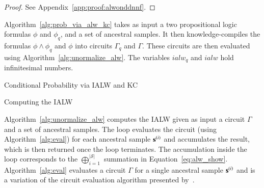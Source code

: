 \begin{proof}
    See Appendix~\ref{app:proof:alwonddnnf}.
\end{proof}


Algorithm~\ref{alg:prob_via_alw_kc} takes as input a two propositional logic formulas $\phi$ and $\phi_q$, and a set of ancestral samples. It then knowledge-compiles the formulas $\phi \land \phi_q$ and $\phi$ into circuits $\Gamma_q$ and $\Gamma$. These circuits are then evaluated using Algorithm~\ref{alg:unormalize_alw}. The variables $ialw_q$ and $ialw$ hold infinitesimal numbers.
\begin{algorithm}[h]



    \caption{Conditional Probability via IALW and KC}
	\label{alg:prob_via_alw_kc}
\end{algorithm}


\begin{algorithm}[h]
    \caption{Computing the IALW}
	\label{alg:unormalize_alw}
\end{algorithm}

Algorithm~\ref{alg:unormalize_alw} computes the IALW given as input a circuit $\Gamma$ and a set of ancestral samples.
The loop evaluates the circuit (using Algorithm~\ref{alg:eval}) for each ancestral sample $\mathbf{s}^{(i)}$ and accumulates the result, which is then returned once the loop terminates. The accumulation inside the loop corresponds to the  $\bigoplus_{i=1}^{\lvert \mathcal{S} \rvert}$ summation in Equation~\ref{eq:alw_show}.
Algorithm~\ref{alg:eval} evaluates a circuit $\Gamma$ for a single ancestral sample $\mathbf{s}^{(i)}$ and is a variation of the circuit evaluation algorithm presented by~\citet{kimmig2017algebraic}.

